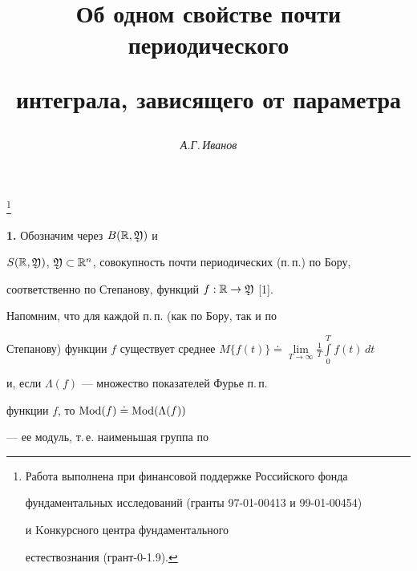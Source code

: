 




\author{\it А.Г.\,Иванов}




\title{Об одном свойстве почти периодического


интеграла, зависящего от параметра}


\thanks{Работа выполнена при финансовой поддержке Российского фонда


фундаментальных исследований (гранты 97-01-00413 и 99-01-00454)


и Kонкурсного центра фундаментального


естествознания (грант-0-1.9).}





\date{}




\pagestyle{plain} %







\maketitle


\label{begin}





{\bf 1.} Обозначим через $B(\Bbb R,\frak Y)$ и


$S(\Bbb R,\frak Y)$, $\frak Y\subset


\Bbb R^n$, совокупность почти периодических (п.\,п.) по Бору,


соответственно по Степанову, функций $f:\Bbb R\to \frak Y$ [1].


Напомним, что для каждой п.\,п. (как по Бору, так и по


Степанову) функции $f$ существует среднее $M\{f(t)\}\doteq


\lim\limits_{T\to \infty}\frac{1}{T}\int\limits_0^T f(t)\,dt$


и, если $\Lambda (f)$ --- множество показателей Фурье п.\,п.


функции $f$, то $\operatorname{Mod} (f)\doteq \operatorname{Mod} (\Lambda (f))$


--- ее модуль, т.\,е. наименьшая группа по


